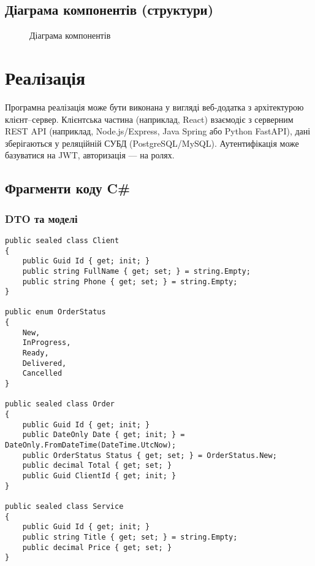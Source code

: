 \documentclass[14pt,a4paper]{extarticle}
\begin{document}
\subsection{Діаграма компонентів (структури)}
\begin{figure}[H]
  \centering
  \caption{Діаграма компонентів}
  \label{fig:components}
\end{figure}

\section{Реалізація}
Програмна реалізація може бути виконана у вигляді веб-додатка з архітектурою клієнт–сервер. Клієнтська частина (наприклад, React) взаємодіє з серверним REST API (наприклад, Node.js/Express, Java Spring або Python FastAPI), дані зберігаються у реляційній СУБД (PostgreSQL/MySQL). Аутентифікація може базуватися на JWT, авторизація — на ролях.

\subsection{Фрагменти коду C\#}
\subsubsection*{DTO та моделі}
\begin{lstlisting}[language=CSharp,caption={Моделі домену для ательє}]
public sealed class Client
{
    public Guid Id { get; init; }
    public string FullName { get; set; } = string.Empty;
    public string Phone { get; set; } = string.Empty;
}

public enum OrderStatus
{
    New,
    InProgress,
    Ready,
    Delivered,
    Cancelled
}

public sealed class Order
{
    public Guid Id { get; init; }
    public DateOnly Date { get; init; } = DateOnly.FromDateTime(DateTime.UtcNow);
    public OrderStatus Status { get; set; } = OrderStatus.New;
    public decimal Total { get; set; }
    public Guid ClientId { get; init; }
}

public sealed class Service
{
    public Guid Id { get; init; }
    public string Title { get; set; } = string.Empty;
    public decimal Price { get; set; }
}
\end{lstlisting}
\end{document}
